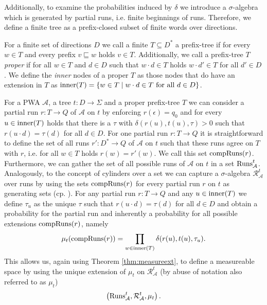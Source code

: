 Additionally, to examine the probabilities induced by $\delta$ we introduce a
$\sigma$-algebra which is generated by partial runs, i.e. finite beginnings of
runs. Therefore, we define a finite tree as a prefix-closed subset of finite
words over directions.
\begin{definition}
  For a finite set of directions $D$ we call a finite $T\subseteq D^{*}$ a
  prefix-tree if for every $w\in T$ and every prefix $v\sqsubseteq w$ holds 
  $v\in T$. Additionally, we call a prefix-tree $T$ \emph{proper} if for all 
  $w\in T$ and $d\in D$ such that $w\cdot d\in T$ holds $w\cdot d'\in T$ for 
  all $d'\in D$. We define the \emph{inner} nodes of a proper $T$ as those
  nodes that do have an extension in $T$ as
  $\operatorname{inner}(T) = \left\{w\in T\mid w\cdot d\in T\text{ for all }d\in D\right\}$.
\end{definition}
For a \ac{PWA} $\mathcal{A}$, a tree $t:D\rightarrow\Sigma$ and a proper 
prefix-tree $T$ we can consider a partial run $r:T\rightarrow Q$ of 
$\mathcal{A}$ on $t$ by enforcing $r(\epsilon) = q_{0}$ and for every 
$u\in\operatorname{inner}(T)$ holds that there is a $\tau$ with $\delta(r(u), t(u), \tau)>0$
such that $r(u\cdot d) = \tau(d)$ for all $d\in D$. For one partial run 
$r:T\rightarrow Q$ it is straightforward to define the set of all runs 
$r':D^{*}\rightarrow Q$ of $\mathcal{A}$ on $t$ such that these runs agree on 
$T$ with $r$, i.e. for all $w\in T$ holds $r(w) = r'(w)$. We call this set 
$\operatorname{compRuns}(r)$. Furthermore, we can gather the set of all possible runs of 
$\mathcal{A}$ on $t$ in a set $\operatorname{Runs}_{\mathcal{A}}^{t}$. Analogously, to the 
concept of cylinders over a set we can capture a $\sigma$-algebra 
$\mathcal{R}_{\mathcal{A}}^{t}$ over runs by using the sets $\operatorname{compRuns}(r)$ for 
every partial run $r$ on $t$ as generating sets (cp.
\cite[Chapter 4]{RandAutoInfTrees}). For any partial run $r:T\rightarrow Q$ and
any $u\in\operatorname{inner}(T)$ we define $\tau_{u}$ as the unique $\tau$ such that
$r(u\cdot d) = \tau(d)$ for all $d\in D$ and obtain a probability for the
partial run and inherently a probability for all possible extensions
$\operatorname{compRuns}(r)$, namely
\begin{equation*}
  \mu_{t}(\operatorname{compRuns}(r)) = \prod\limits_{w\in\operatorname{inner}(T)}
    \delta(r(u),t(u),\tau_{u}).
\end{equation*}
This allows us, again using Theorem \ref{thm:measureext}, to define a 
measureable space by using the unique extension of $\mu_{t}$ on 
$\mathcal{R}_{\mathcal{A}}^{t}$ (by abuse of notation also referred to as 
$\mu_{t}$)
\begin{equation*}
  \left(\operatorname{Runs}_{\mathcal{A}}^{t}, \mathcal{R}_{\mathcal{A}}^{t}, \mu_{t}\right).
\end{equation*}
